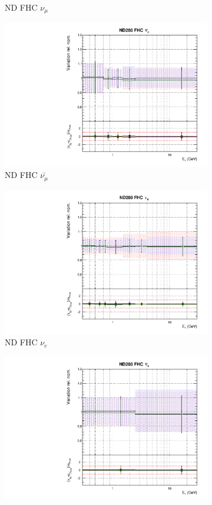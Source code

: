 \begin{figure}
\begin{subfigure}{0.45\textwidth}
  \caption{ND FHC $\nu_{\mu}$}
\end{subfigure}
\begin{subfigure}{0.45\textwidth}
  \centering
  \includegraphics[width=0.75\linewidth]{figs/polyasmvsflux_1}
  \caption{ND FHC $\bar{\nu_{\mu}}$}
\end{subfigure}
\begin{subfigure}{0.45\textwidth}
  \centering
  \includegraphics[width=0.75\linewidth]{figs/polyasmvsflux_2}
  \caption{ND FHC $\nu_{e}$}
\end{subfigure}
\begin{subfigure}{0.45\textwidth}
  \centering
  \includegraphics[width=0.75\linewidth]{figs/polyasmvsflux_3}

\end{subfigure}
\end{figure}
